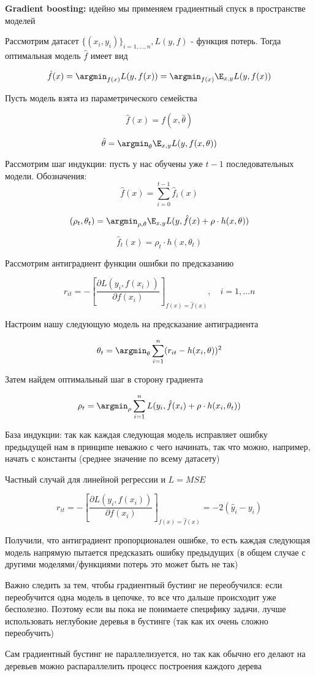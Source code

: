 \textbf{Gradient boosting:} идейно мы применяем градиентный спуск в пространстве моделей

Рассмотрим датасет $\{(x_i, y_i)\}_{i=1, \ldots, n}, L(y,f)$ - функция потерь. Тогда оптимальная модель $\hat{f}$ имеет вид

\[ \hat{f}(x)=\argmin_{f(x)} L(y, f(x))=\argmin_{f(x)} \E_{x,y} L(y, f(x))\]

Пусть модель взята из параметрического семейства

\[ \hat{f}(x)=f(x, \hat{\theta})\]

\[ \hat{\theta} = \argmin_\theta \E_{x,y} L(y, f(x, \theta))\]

Рассмотрим шаг индукции: пусть у нас обучены уже $t-1$ последовательных модели. Обозначения:
\[\hat{f}(x) = \sum_{i=0}^{t-1} \hat{f}_i(x)\]

\[ (\rho_t, \theta_t)=\argmin_{\rho, \theta} \E_{x,y} L(y, \hat{f}(x)+\rho \cdot h(x, \theta))\]

\[ \hat{f}_t(x)=\rho_t \cdot h(x, \theta_t)\]

Рассмотрим антиградиент функции ошибки по предсказанию

\[ r_{it} = -\left[ \frac{\partial L(y_i, f(x_i))}{\partial f(x_i)}\right]_{f(x)=\hat{f}(x)}, \quad i=1, \ldots n \]

Настроим нашу следующую модель на предсказание антиградиента

\[ \theta_t = \argmin_\theta \sum_{i=1}^n (r_{it} - h(x_i, \theta))^2 \]

Затем найдем оптимальный шаг в сторону градиента

\[ \rho_t = \argmin_\rho \sum_{i=1}^n L(y_i, \hat{f}(x_i)+\rho \cdot h(x_i, \theta_t)) \]

База индукции: так как каждая следующая модель исправляет ошибку предыдущей нам в принципе неважно с чего начинать, так что можно, например, начать с константы (среднее значение по всему датасету)

Частный случай для линейной регрессии и $L=MSE$

\[ r_{it} = -\left[ \frac{\partial L(y_i, f(x_i))}{\partial f(x_i)}\right]_{f(x)=\hat{f}(x)}=-2(\hat{y}_i - y_i) \]

Получили, что антиградиент пропорционален ошибке, то есть каждая следующая модель напрямую пытается предсказать ошибку предыдущих (в общем случае с другими моделями/функциями потерь это может быть не так)

\begin{lemmanote}
    Важно следить за тем, чтобы градиентный бустинг не переобучился: если переобучится одна модель в цепочке, то все что дальше происходит уже бесполезно. Поэтому если вы пока не понимаете специфику задачи, лучше использовать неглубокие деревья в бустинге (так как их очень сложно переобучить)
\end{lemmanote}

\begin{lemmanote}
    Сам градиентный бустинг не параллелизуется, но так как обычно его делают на деревьев можно распараллелить процесс построения каждого дерева
\end{lemmanote}